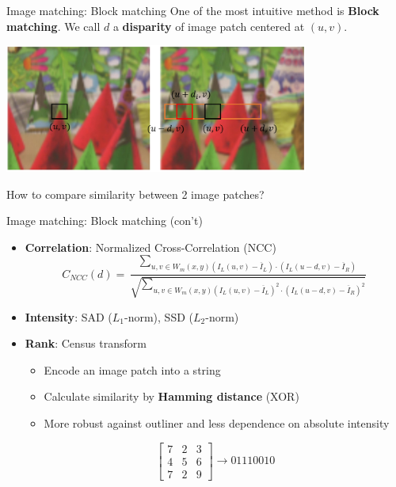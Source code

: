 \documentclass{beamer}
\begin{document}
\begin{frame}{Image matching: Block matching}
    One of the most intuitive method is \textbf{Block matching}. We call $d$ a \textbf{disparity} of image patch centered at $(u,v)$.
    \smallskip
    \begin{center}
        \includegraphics[width=10cm]{block_matching.jpg}
    \end{center}
    How to compare similarity between 2 image patches?
\end{frame}

\begin{frame}{Image matching: Block matching (con't)}
    \begin{itemize}
        \item \textbf{Correlation}: Normalized Cross-Correlation (NCC)
        $$C_{NCC}(d)=\frac{\sum_{u,v\in W_m(x,y)(I_L(u,v)-\overline{I}_L)\cdot(I_L(u-d,v)-\overline{I}_R)}}{\sqrt{\sum_{u,v\in W_m(x,y)(I_L(u,v)-\overline{I}_L)^2\cdot(I_L(u-d,v)-\overline{I}_R)^2}}}$$
        \item \textbf{Intensity}: SAD ($L_1$-norm), SSD ($L_2$-norm)
        \item \textbf{Rank}: Census transform
        \begin{itemize}
            \item Encode an image patch into a string
            \item Calculate similarity by \textbf{Hamming distance} (XOR)
            \item More robust against outliner and less dependence on absolute intensity
        \end{itemize}
        \smallskip
        $$\begin{bmatrix}
        7 & 2 & 3\\
        4 & 5 & 6\\
        7 & 2 & 9
        \end{bmatrix} \rightarrow 01110010$$
    \end{itemize}
\end{frame}
\end{document}
